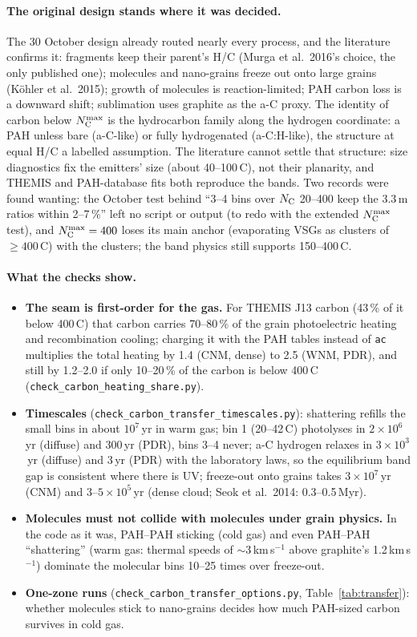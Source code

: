 \documentclass[11pt,a4paper]{article}
\newcommand{\NC}{N_{\rm C}}
\begin{document}
\paragraph{The original design stands where it was decided.} The 30 October design already routed nearly every
process, and the literature confirms it: fragments keep their parent's H/C (Murga et al.\ 2016's choice, the only
published one); molecules and nano-grains freeze out onto large grains (K\"ohler et al.\ 2015); growth of molecules is
reaction-limited; PAH carbon loss is a downward shift; sublimation uses graphite as the a-C proxy. The identity of carbon
below $\NC^{\max}$ is the hydrocarbon family along the hydrogen coordinate: a PAH unless bare (a-C-like) or fully
hydrogenated (a-C:H-like), the structure at equal H/C a labelled assumption. The literature cannot settle that
structure: size diagnostics fix the emitters' size (about 40--100\,C), not their planarity, and THEMIS and PAH-database
fits both reproduce the bands. Two records were found wanting: the October test behind ``3--4 bins over $\NC$
20--400 keep the 3.3\,\textmu m ratios within 2--7\,\%'' left no script or output (to redo with the extended
$\NC^{\max}$ test), and $\NC^{\max} = 400$ loses its main anchor (evaporating VSGs as clusters of $\ge400$\,C) with the
clusters; the band physics still supports 150--400\,C.

\paragraph{What the checks show.}
\begin{itemize}
\item \textbf{The seam is first-order for the gas.} For THEMIS J13 carbon (43\,\% of it below 400\,C) that carbon carries
  70--80\,\% of the grain photoelectric heating and recombination cooling; charging it with the PAH tables instead of
  \texttt{ac} multiplies the total heating by 1.4 (CNM, dense) to 2.5 (WNM, PDR), and still by 1.2--2.0 if only
  10--20\,\% of the carbon is below 400\,C (\texttt{check\_carbon\_heating\_share.py}).
\item \textbf{Timescales} (\texttt{check\_carbon\_transfer\_timescales.py}): shattering refills the small bins in about
  $10^7$\,yr in warm gas; bin 1 (20--42\,C) photolyses in $2\times10^6$\,yr (diffuse) and 300\,yr (PDR), bins 3--4 never;
  a-C hydrogen relaxes in $3\times10^3$\,yr (diffuse) and 3\,yr (PDR) with the laboratory laws, so the equilibrium band
  gap is consistent where there is UV; freeze-out onto grains takes $3\times10^7$\,yr (CNM) and $3$--$5\times10^5$\,yr
  (dense cloud; Seok et al.\ 2014: 0.3--0.5\,Myr).
\item \textbf{Molecules must not collide with molecules under grain physics.} In the code as it was, PAH--PAH sticking
  (cold gas) and even PAH--PAH ``shattering'' (warm gas: thermal speeds of $\sim$3\,km\,s$^{-1}$ above graphite's
  1.2\,km\,s$^{-1}$) dominate the molecular bins 10--25 times over freeze-out.
\item \textbf{One-zone runs} (\texttt{check\_carbon\_transfer\_options.py}, Table~\ref{tab:transfer}): whether molecules
  stick to nano-grains decides how much PAH-sized carbon survives in cold gas.
\end{itemize}
\end{document}
